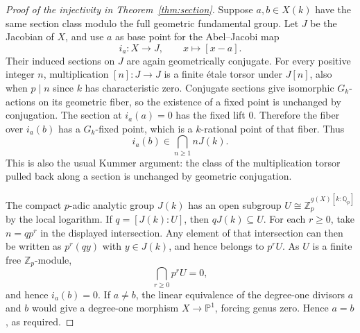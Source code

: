 \begin{proof}[Proof of the injectivity in Theorem~\ref{thm:section}]
Suppose $a,b\in X(k)$ have the same section class modulo the full
geometric fundamental group.  Let $J$ be the Jacobian of $X$, and use
$a$ as base point for the Abel--Jacobi map
\[
 i_a:X\longrightarrow J,\qquad x\longmapsto [x-a].
\]
Their induced sections on $J$ are again geometrically conjugate.
For every positive integer $n$, multiplication
$[n]:J\to J$ is a finite \'etale torsor under $J[n]$, also when
$p\mid n$ since $k$ has characteristic zero.  Conjugate sections give
isomorphic $G_k$-actions on its geometric fiber, so the existence of a
fixed point is unchanged by conjugation.  The section at $i_a(a)=0$
has the fixed lift $0$.  Therefore the fiber over $i_a(b)$ has a
$G_k$-fixed point, which is a $k$-rational point of that fiber.  Thus
\[
 i_a(b)\in\bigcap_{n\geq1}nJ(k).
\]
This is also the usual Kummer argument: the class of the multiplication
torsor pulled back along a section is unchanged by geometric conjugation.

The compact $p$-adic analytic group $J(k)$ has an open subgroup
$U\cong\mathbb Z_p^{g(X)[k:\mathbb Q_p]}$ by the local logarithm.  If
$q=[J(k):U]$, then $qJ(k)\subseteq U$.  For each $r\geq0$, take
$n=qp^r$ in the displayed intersection.  Any element of that intersection
can then be written as $p^r(qy)$ with $y\in J(k)$, and hence belongs
to $p^rU$.  As $U$ is a finite free $\mathbb Z_p$-module,
\[
 \bigcap_{r\geq0}p^rU=0,
\]
and hence $i_a(b)=0$.  If $a\ne b$, the linear equivalence of the
degree-one divisors $a$ and $b$ would give a degree-one morphism
$X\to\mathbb P^1$, forcing genus zero.  Hence $a=b$, as required.
\end{proof}

